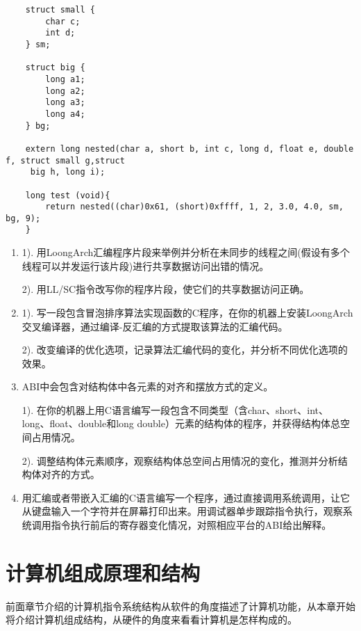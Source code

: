 \documentclass[]{ctexbook}
\begin{document}
\begin{verbatim}
    struct small {
        char c;
        int d;
    } sm;

    struct big {
        long a1;
        long a2;
        long a3;
        long a4;
    } bg;

    extern long nested(char a, short b, int c, long d, float e, double f, struct small g,struct
     big h, long i);

    long test (void){
        return nested((char)0x61, (short)0xffff, 1, 2, 3.0, 4.0, sm, bg, 9);
    }
\end{verbatim}

\begin{enumerate}
\def\labelenumi{\arabic{enumi}.}
\setcounter{enumi}{1}
\item
  1). 用LoongArch汇编程序片段来举例并分析在未同步的线程之间(假设有多个线程可以并发运行该片段)进行共享数据访问出错的情况。

  2). 用LL/SC指令改写你的程序片段，使它们的共享数据访问正确。
\item
  1). 写一段包含冒泡排序算法实现函数的C程序，在你的机器上安装LoongArch交叉编译器，通过编译-反汇编的方式提取该算法的汇编代码。

  2). 改变编译的优化选项，记录算法汇编代码的变化，并分析不同优化选项的效果。
\item
  ABI中会包含对结构体中各元素的对齐和摆放方式的定义。

  1). 在你的机器上用C语言编写一段包含不同类型（含char、short、int、long、float、double和long double）元素的结构体的程序，并获得结构体总空间占用情况。

  2). 调整结构体元素顺序，观察结构体总空间占用情况的变化，推测并分析结构体对齐的方式。
\item
  用汇编或者带嵌入汇编的C语言编写一个程序，通过直接调用系统调用，让它从键盘输入一个字符并在屏幕打印出来。用调试器单步跟踪指令执行，观察系统调用指令执行前后的寄存器变化情况，对照相应平台的ABI给出解释。
\end{enumerate}

\newpage

\hypertarget{ux8ba1ux7b97ux673aux7ec4ux6210ux539fux7406ux548cux7ed3ux6784}{%
\chapter{计算机组成原理和结构}\label{ux8ba1ux7b97ux673aux7ec4ux6210ux539fux7406ux548cux7ed3ux6784}}

前面章节介绍的计算机指令系统结构从软件的角度描述了计算机功能，从本章开始将介绍计算机组成结构，从硬件的角度来看看计算机是怎样构成的。
\end{document}
